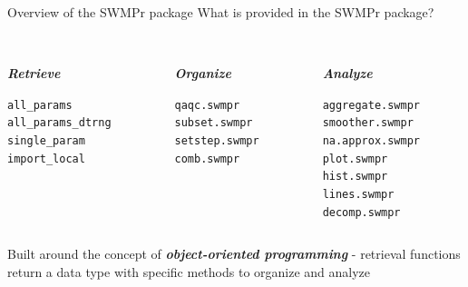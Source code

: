 \documentclass[xcolor=svgnames]{beamer}\usepackage[]{graphicx}\usepackage[]{color}
\makeatletter
\newcommand{\hlstd}[1]{\textcolor[rgb]{0.345,0.345,0.345}{#1}}%
\newenvironment{kframe}{%
 \def\at@end@of@kframe{}%
 \ifinner\ifhmode%
  \def\at@end@of@kframe{\end{minipage}}%
  \begin{minipage}{\columnwidth}%
 \fi\fi%
 \def\FrameCommand##1{\hskip\@totalleftmargin \hskip-\fboxsep
 \colorbox{shadecolor}{##1}\hskip-\fboxsep
     \hskip-\linewidth \hskip-\@totalleftmargin \hskip\columnwidth}%
 \MakeFramed {\advance\hsize-\width
   \@totalleftmargin\z@ \linewidth\hsize
   \@setminipage}}%
 {\par\unskip\endMakeFramed%
 \at@end@of@kframe}
\newenvironment{knitrout}{}{} %
\newcommand{\Bigtxt}[1]{\textbf{\textit{#1}}}
\makeatother
\begin{document}
\begin{frame}[fragile]{Overview of the SWMPr package}
What is provided in the SWMPr package? \\~\\
\begin{columns}[t]
\begin{column}{0.3\textwidth}
\Bigtxt{Retrieve}
\begin{knitrout}
\color{fgcolor}\begin{kframe}
\begin{alltt}
\hlstd{all_params}
\hlstd{all_params_dtrng}
\hlstd{single_param}
\hlstd{import_local}
\end{alltt}
\end{kframe}
\end{knitrout}
\end{column}
\begin{column}{0.3\textwidth}
\Bigtxt{Organize}
\begin{knitrout}
\color{fgcolor}\begin{kframe}
\begin{alltt}
\hlstd{qaqc.swmpr}
\hlstd{subset.swmpr}
\hlstd{setstep.swmpr}
\hlstd{comb.swmpr}
\end{alltt}
\end{kframe}
\end{knitrout}
\end{column}
\begin{column}{0.3\textwidth}
\Bigtxt{Analyze}
\begin{knitrout}
\color{fgcolor}\begin{kframe}
\begin{alltt}
\hlstd{aggregate.swmpr}
\hlstd{smoother.swmpr}
\hlstd{na.approx.swmpr}
\hlstd{plot.swmpr}
\hlstd{hist.swmpr}
\hlstd{lines.swmpr}
\hlstd{decomp.swmpr}
\end{alltt}
\end{kframe}
\end{knitrout}
\end{column}
\end{columns}
\vspace{0.15in}
Built around the concept of \Bigtxt{object-oriented programming} - retrieval functions return a data type with specific methods to organize and analyze
\end{frame}
\end{document}

